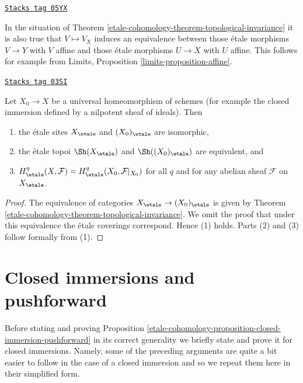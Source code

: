 \begin{remark}
\label{etale-cohomology-remark-affine-inside-equivalence}
\href{https://stacks.math.columbia.edu/tag/05YX}{\texttt{Stacks tag 05YX}}

In the situation of
Theorem \ref{etale-cohomology-theorem-topological-invariance}
it is also true that $V \mapsto V_X$ induces an equivalence
between those \'etale morphisms $V \to Y$ with $V$ affine and
those \'etale morphisms $U \to X$ with $U$ affine.
This follows for example from
Limits, Proposition \ref{limits-proposition-affine}.
\end{remark}

\begin{proposition}

\label{etale-cohomology-proposition-topological-invariance}
\href{https://stacks.math.columbia.edu/tag/03SI}{\texttt{Stacks tag 03SI}}

Let $X_0 \to X$ be a universal homeomorphism of schemes
(for example the closed immersion defined by a nilpotent sheaf of ideals).
Then
\begin{enumerate}
\item the \'etale sites $X_\etale$ and $(X_0)_\etale$ are isomorphic,
\item the \'etale topoi $\Sh(X_\etale)$ and $\Sh((X_0)_\etale)$
are equivalent, and
\item $H^q_\etale(X, \mathcal{F}) = H^q_\etale(X_0, \mathcal{F}|_{X_0})$
for all $q$ and
for any abelian sheaf $\mathcal{F}$ on $X_\etale$.
\end{enumerate}
\end{proposition}

\begin{proof}
The equivalence of categories $X_\etale \to (X_0)_\etale$ is
given by Theorem \ref{etale-cohomology-theorem-topological-invariance}. We omit
the proof that under this equivalence the \'etale coverings correspond.
Hence (1) holds. Parts (2) and (3) follow formally from (1).
\end{proof}

\section{Closed immersions and pushforward}
\label{etale-cohomology-section-closed-immersions}
Before stating and proving
Proposition \ref{etale-cohomology-proposition-closed-immersion-pushforward}
in its correct generality we briefly state and prove it for
closed immersions. Namely, some of the preceding arguments
are quite a bit easier to follow in the case of a closed immersion and
so we repeat them here in their simplified form.


